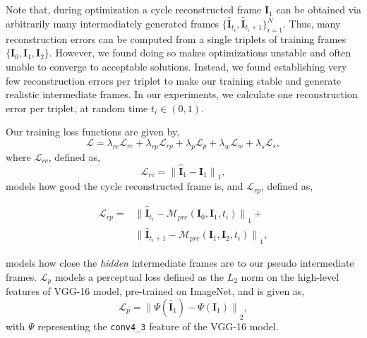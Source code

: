 \documentclass[10pt,twocolumn,letterpaper]{article}
\begin{document}
Note that, during optimization a cycle reconstructed frame $\hat{\textbf{I}}_{1}$ can be obtained via arbitrarily many intermediately generated frames $\{\hat{\textbf{I}}_{t_{i}},\hat{\textbf{I}}_{t_{i}+1}\}_{i=1}^{N}$. Thus, many reconstruction errors can be computed from a single triplets of training frames $\{\textbf{I}_{0},\textbf{I}_{1},\textbf{I}_{2}\}$. However, we found doing so makes  optimizations unstable and often unable to converge to acceptable solutions. Instead, we found establishing very few reconstruction errors per triplet to make our training stable and generate realistic intermediate frames. In our experiments, we calculate one reconstruction error per triplet, at random time $t_{i}\in(0,1)$. 

Our training loss functions are given by, 
\begin{equation}\label{eq:8}
\mathcal{L} = \lambda_{rc}\mathcal{L}_{rc} + \lambda_{rp}\mathcal{L}_{rp} + \lambda_{p}\mathcal{L}_{p} + \lambda_{w}\mathcal{L}_{w} + \lambda_{s}\mathcal{L}_{s} , 
\end{equation}
where $\mathcal{L}_{rc}$, defined as, 
\begin{equation}\label{eq:9}
\mathcal{L}_{rc} = {\lVert\hat{\textbf{I}}_{1}-\textbf{I}_{1}\rVert}_{1} , 
\end{equation}
models how good the cycle reconstructed frame is, and $\mathcal{L}_{rp}$, defined as, 

\begin{equation}\label{eq:10}
\begin{split}
\mathcal{L}_{rp} = &{\lVert\hat{\textbf{I}}_{t_{i}}-\mathcal{M}_{pre}(\textbf{I}_{0},\textbf{I}_{1},t_{i})\rVert}_{1} + \\
&{\lVert\hat{\textbf{I}}_{t_{i}+1}-\mathcal{M}_{pre}(\textbf{I}_{1},\textbf{I}_{2},t_{i})\rVert}_{1}, 
\end{split}
\end{equation}

 models how close the \textit{hidden} intermediate frames are to our pseudo intermediate frames. $\mathcal{L}_{p}$ models a perceptual loss defined as the $L_{2}$ norm on the high-level features of VGG-16 model, pre-trained on ImageNet, and is given as, 
\begin{equation}\label{eq:11}
\mathcal{L}_{p} = {\lVert\Psi(\hat{\textbf{I}}_{1})-\Psi(\textbf{I}_{1})\rVert}_{2} , 
\end{equation}
with $\Psi$ representing the \texttt{conv4\_3} feature of the VGG-16 model.
\end{document}
